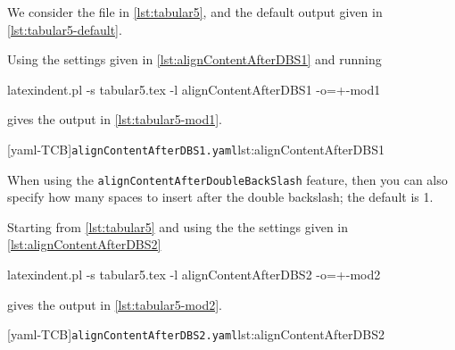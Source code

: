 \documentclass[10pt]{article}
\begin{document}
 \begin{example}
 We consider the file in \cref{lst:tabular5}, and the default output given in
 \cref{lst:tabular5-default}.

 \begin{cmhtcbraster}
 \end{cmhtcbraster}

 Using the settings given in \cref{lst:alignContentAfterDBS1} and running

 \begin{commandshell}
latexindent.pl -s tabular5.tex -l alignContentAfterDBS1 -o=+-mod1
\end{commandshell}

 gives the output in \cref{lst:tabular5-mod1}.

 \begin{cmhtcbraster}[raster columns=2,
   raster left skip=-2.5cm,
   raster column skip=.03\linewidth]
  [yaml-TCB]{\texttt{alignContentAfterDBS1.yaml}}{lst:alignContentAfterDBS1}
 \end{cmhtcbraster}
 \end{example}

 \begin{example}
 When using the \texttt{alignContentAfterDoubleBackSlash} feature, then you can also
 specify how many spaces to insert after the double backslash; the default is 1.

 Starting from \cref{lst:tabular5} and using the the settings given in
 \cref{lst:alignContentAfterDBS2}

 \begin{commandshell}
latexindent.pl -s tabular5.tex -l alignContentAfterDBS2 -o=+-mod2
\end{commandshell}

 gives the output in \cref{lst:tabular5-mod2}.

 \begin{cmhtcbraster}[raster columns=2,
   raster left skip=-2.5cm,
   raster column skip=.03\linewidth]
  [yaml-TCB]{\texttt{alignContentAfterDBS2.yaml}}{lst:alignContentAfterDBS2}
 \end{cmhtcbraster}
 \end{example}
\end{document}

